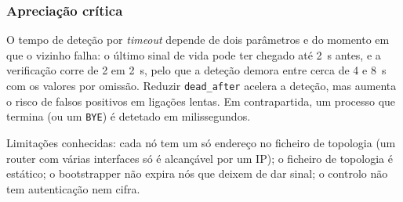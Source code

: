 \subsubsection{Apreciação crítica}

O tempo de deteção por \emph{timeout} depende de dois parâmetros e do momento em que o vizinho
falha: o último sinal de vida pode ter chegado até 2~s antes, e a verificação corre de 2 em 2~s,
pelo que a deteção demora entre cerca de 4 e 8~s com os valores por omissão. Reduzir
\texttt{dead\_after} acelera a deteção, mas aumenta o risco de falsos positivos em ligações lentas. Em
contrapartida, um processo que termina (ou um \texttt{BYE}) é detetado em milissegundos.

Limitações conhecidas: cada nó tem um só endereço no ficheiro de topologia (um router com várias
interfaces só é alcançável por um IP); o ficheiro de topologia é estático; o bootstrapper não expira
nós que deixem de dar sinal; o controlo não tem autenticação nem cifra.
